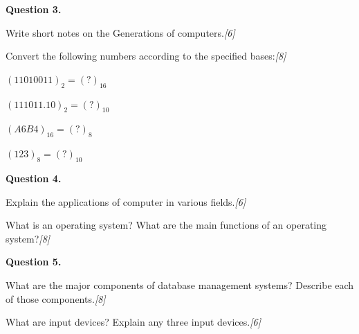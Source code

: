 \documentclass[11pt,a4paper]{article}
\newcommand{\pts}[1]{\hfill\textit{[#1]}}
\begin{document}
\noindent\textbf{Question 3.}
\begin{parts}
  \item Write short notes on the Generations of computers.\pts{6}
  \item Convert the following numbers according to the specified bases:\pts{8}
  \begin{parts}
    \item $(11010011)_2 = (?)_{16}$
    \item $(111011.10)_2 = (?)_{10}$
    \item $(A6B4)_{16} = (?)_{8}$
    \item $(123)_8 = (?)_{10}$
  \end{parts}
\end{parts}

\bigskip

\noindent\textbf{Question 4.}
\begin{parts}
  \item Explain the applications of computer in various fields.\pts{6}
  \item What is an operating system? What are the main functions of an operating system?\pts{8}
\end{parts}

\bigskip

\noindent\textbf{Question 5.}
\begin{parts}
  \item What are the major components of database management systems? Describe each of those components.\pts{8}
  \item What are input devices? Explain any three input devices.\pts{6}
\end{parts}

\bigskip
\end{document}

